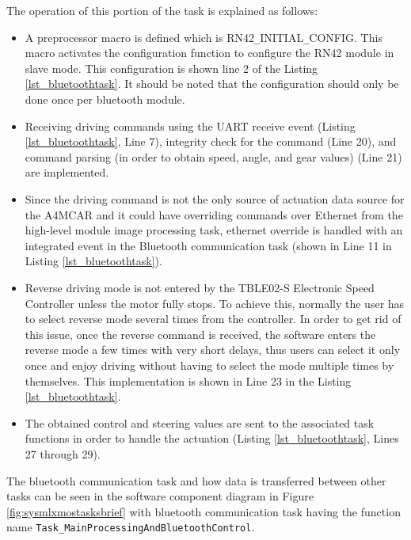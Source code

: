 The operation of this portion of the task is explained as follows:
\begin{itemize}
	\item A preprocessor macro is defined which is RN42\texttt{\_}INITIAL\texttt{\_}CONFIG. This macro activates the configuration function to configure the RN42 module in slave mode. This configuration is shown line 2 of the Listing \ref{lst_bluetoothtask}. It should be noted that the configuration should only be done once per bluetooth module.
	\item Receiving driving commands using  the UART receive event (Listing \ref{lst_bluetoothtask}, Line 7), integrity check for the command (Line 20), and command parsing (in order to obtain speed, angle, and gear values) (Line 21) are implemented.
	\item Since the driving command is not the only source of actuation data source for the A4MCAR and it could have overriding commands over Ethernet from the high-level module image processing task, ethernet override is handled with an integrated event in the Bluetooth communication task (shown in Line 11 in Listing \ref{lst_bluetoothtask}).
	\item Reverse driving mode is not entered by the TBLE02-S Electronic Speed Controller unless the motor fully stops. To achieve this, normally the  user has to select reverse mode several times from the controller. In order to get rid of this issue, once the reverse command is received, the software enters the reverse mode a few times with very short delays, thus users can select it only once and enjoy driving without having to select the mode multiple times by themselves. This implementation is shown in Line 23 in the Listing \ref{lst_bluetoothtask}.
	\item The obtained control and steering values are sent to the associated task functions in order to handle the actuation (Listing \ref{lst_bluetoothtask}, Lines 27 through 29).
\end{itemize}


The bluetooth communication task and how data is transferred between other tasks can be seen in the software component diagram in Figure \ref{fig:sysmlxmostasksbrief} with bluetooth communication task having the function name \texttt{Task\texttt{\_}MainProcessingAndBluetoothControl}.

